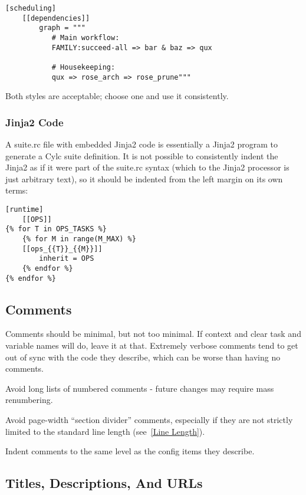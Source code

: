 \lstset{language=suiterc}
\begin{lstlisting}
[scheduling]
    [[dependencies]]
        graph = """
           # Main workflow:
           FAMILY:succeed-all => bar & baz => qux

           # Housekeeping:
           qux => rose_arch => rose_prune"""
\end{lstlisting}

Both styles are acceptable; choose one and use it consistently.

\subsubsection{Jinja2 Code}

A suite.rc file with embedded Jinja2 code is essentially a Jinja2 program to
generate a Cylc suite definition. It is not possible to consistently indent the
Jinja2 as if it were part of the suite.rc syntax (which to the Jinja2 processor
is just arbitrary text), so it should be indented from the left margin on
its own terms:

\lstset{language=suiterc}
\begin{lstlisting}
[runtime]
    [[OPS]]
{% for T in OPS_TASKS %}
    {% for M in range(M_MAX) %}
    [[ops_{{T}}_{{M}}]]
        inherit = OPS
    {% endfor %}
{% endfor %}
\end{lstlisting}

\subsection{Comments}

Comments should be minimal, but not too minimal. If context and clear
task and variable names will do, leave it at that. Extremely verbose comments
tend to get out of sync with the code they describe, which can be worse
than having no comments.

Avoid long lists of numbered comments - future changes may require mass
renumbering.

Avoid page-width ``section divider'' comments, especially if they are not
strictly limited to the standard line length (see~\ref{Line Length}).

Indent comments to the same level as the config items they describe.

\subsection{Titles, Descriptions, And URLs}

